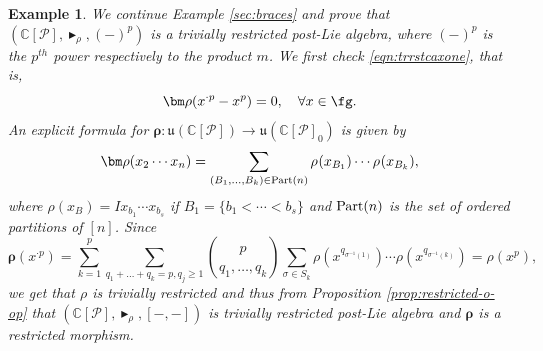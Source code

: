 \documentclass[12pt]{article}
\newcommand{\btr}{\blacktriangleright}
\newtheorem{example}[theorem]{Example}
\begin{document}
\begin{example} We continue Example \ref{sec:braces} and prove that
$
(\mathbb{C}[\mathcal{P}],\btr_{\rho}, (-)^{p})
$ is a trivially restricted post-Lie algebra, where $(-)^{p}$ is the $p^{th}$ power respectively to the product $m$.
We first check \eqref{eqn:trrstcaxone}, that is, 
$$
{\bm \rho}(x^{\cdot p} - x^{p}) = 0, \quad \forall x\in\fg.
$$
An explicit formula for $\bm{\rho}\colon \mathfrak{u}(\mathbb{C}[\mathcal{P}])\to\mathfrak{u}(\mathbb{C}[\mathcal{P}]_0)$ is given by
$$
{\bm \rho}(x_2\cdots x_n) = \sum_{(B_1,\ldots,B_k) \in {\rm Part}(n)} \rho_{}(x_{B_1})\cdots \rho_{}(x_{B_k}),
$$
where $\rho(x_{B})=Ix_{b_1}\cdots x_{b_s}$ if $B_1 = \{b_1 < \cdots < b_s\}$
and ${\rm Part}(n)$ is the set of ordered partitions of $[n]$. Since 
$$
{\bm \rho}(x^{\cdot p}) = \sum_{k=1}^{p}\sum_{q_1+\ldots+q_k=p, q_j\geq 1}\binom{p}{q_1,\ldots,q_k}\sum_{\sigma \in S_k} \rho(x^{ q_{\sigma^{-1}(1)}})\cdots \rho(x^{ q_{\sigma^{-1}(k)}}) = \rho(x^p),
$$
we get that $\rho$ is trivially restricted and thus from Proposition \ref{prop:restricted-o-op} that $(\mathbb{C}[\mathcal{P}],\btr_{\rho}, [-,-])$ is trivially restricted post-Lie algebra and ${\bm \rho}$ is a restricted morphism.
\end{example}
\end{document}
